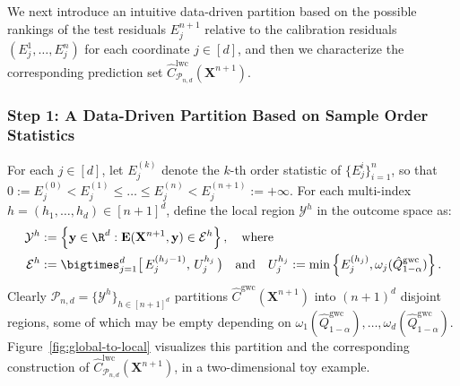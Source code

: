 We next introduce an intuitive data-driven partition based on the possible rankings of the test residuals $E_j^{n+1}$ relative to the calibration residuals $(E_j^{1},\ldots,E_j^{n})$ for each coordinate $j \in [d]$, and then we characterize the corresponding prediction set $\hat{C}^{\mathrm{lwc}}_{\mathcal{P}_{n,d}}(\mathbf{X}^{n+1})$.

\subsubsection{Step 1: A Data-Driven Partition Based on Sample Order Statistics}


For each $j \in [d]$, let $E^{(k)}_j$ denote the $k$-th order statistic of $\{{E}^i_j\}_{i=1}^n$, so that $0 := E^{(0)}_j < E^{(1)}_j \leq \ldots \leq E^{(n)}_j < E^{(n+1)}_j := +\infty$. 
For each multi-index $h=(h_1,\ldots,h_d)\in [n+1]^d$, define the local region $\mathcal{Y}^h$ in the outcome space as:
\begin{equation}\label{eq:rectangle-explicit}
    \begin{aligned}
        \mathcal{Y}^h &:= \left\{\mathbf y \in \R^d: \mathbf E(\mathbf{X}^{n+1}, \mathbf y) \in \mathcal{E}^h\right\}, \quad \text{where}\\
        \mathcal{E}^h &:=  \bigtimes_{j=1}^d \bigl[\,E^{(h_j-1)}_j,\, U^{h_j}_j\,\bigr) \quad\text{and} \quad U^{h_j}_j := \min\left\{E^{(h_j)}_j,  \omega_j(\hat{Q}^{\mathrm{gwc}}_{1-\alpha})\right\}
        .
    \end{aligned}
\end{equation}
Clearly $ \mathcal{P}_{n,d} = \{\mathcal{Y}^h\}_{h\in[n+1]^d}$ partitions $\hat{C}^\mathrm{gwc}(\mathbf{X}^{n+1})$ into $(n+1)^d$ disjoint regions, some of which may be empty depending on $\omega_1(\hat{Q}^{\mathrm{gwc}}_{1-\alpha}),\ldots,\omega_d(\hat{Q}^{\mathrm{gwc}}_{1-\alpha})$.
Figure~\ref{fig:global-to-local} visualizes this partition and the corresponding construction of $\hat{C}^{\mathrm{lwc}}_{\mathcal{P}_{n,d}}(\mathbf{X}^{n+1})$, in a two-dimensional toy example.

